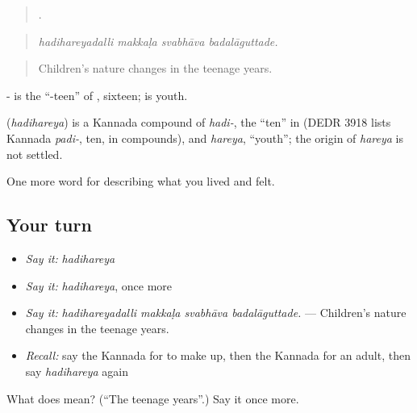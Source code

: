 \begin{quote}
   .
\end{quote}

\begin{quote}
\emph{hadihareyadalli makkaḷa svabhāva badalāguttade.}
\end{quote}

\begin{quote}
Children's nature changes in the teenage years.
\end{quote}

- is the \textquotedblleft{}-teen\textquotedblright{} of , sixteen;  is youth.

\begin{cousinweb}
\textbf{} (\emph{hadihareya}) is a Kannada compound of \emph{hadi-}, the \textquotedblleft{}ten\textquotedblright{} in  (DEDR 3918 lists Kannada \emph{padi-}, ten, in compounds), and \emph{hareya}, \textquotedblleft{}youth\textquotedblright{}; the origin of \emph{hareya} is not settled.
\end{cousinweb}

\begin{grammarlens}[title={What you've built}]
One more word for describing what you lived and felt.
\end{grammarlens}

\subsection*{Your turn}
\begin{itemize}
\raggedright
  \item \emph{Say it:} \emph{hadihareya}
  \item \emph{Say it:} \emph{hadihareya}, once more
  \item \emph{Say it:} \emph{hadihareyadalli makkaḷa svabhāva badalāguttade.} — Children's nature changes in the teenage years.
  \item \emph{Recall:} say the Kannada for to make up, then the Kannada for an adult, then say \emph{hadihareya} again
\end{itemize}

\begin{tcolorbox}[breakable,colback=teal!4,colframe=teal!35!black,title={Before you move on}]
What does  mean? (\textquotedblleft{}The teenage years\textquotedblright{}.) Say it once more.
\end{tcolorbox}
